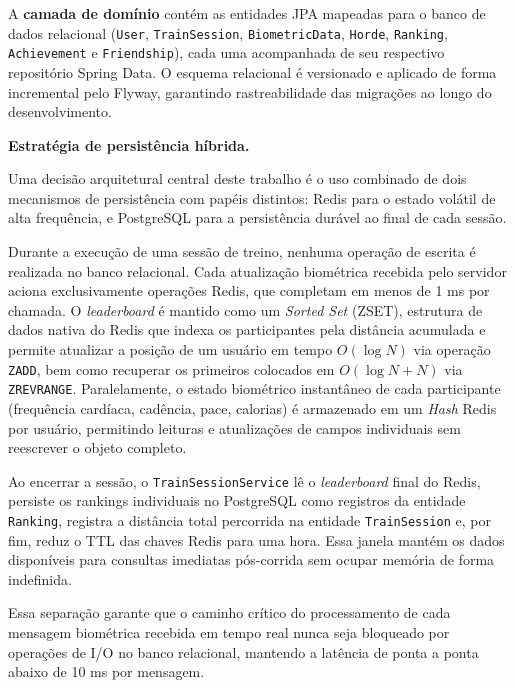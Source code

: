 A \textbf{camada de domínio} contém as entidades JPA mapeadas para o banco de dados relacional (\texttt{User}, \texttt{TrainSession}, \texttt{BiometricData}, \texttt{Horde}, \texttt{Ranking}, \texttt{Achievement} e \texttt{Friendship}), cada uma acompanhada de seu respectivo repositório Spring Data. O esquema relacional é versionado e aplicado de forma incremental pelo Flyway, garantindo rastreabilidade das migrações ao longo do desenvolvimento.

\vspace{0.2cm}
\noindent\textbf{Estratégia de persistência híbrida.}
\vspace{0.2cm}

Uma decisão arquitetural central deste trabalho é o uso combinado de dois mecanismos de persistência com papéis distintos: Redis para o estado volátil de alta frequência, e PostgreSQL para a persistência durável ao final de cada sessão.

Durante a execução de uma sessão de treino, nenhuma operação de escrita é realizada no banco relacional. Cada atualização biométrica recebida pelo servidor aciona exclusivamente operações Redis, que completam em menos de 1 ms por chamada. O \textit{leaderboard} é mantido como um \textit{Sorted Set} (ZSET), estrutura de dados nativa do Redis que indexa os participantes pela distância acumulada e permite atualizar a posição de um usuário em tempo $O(\log N)$ via operação \texttt{ZADD}, bem como recuperar os primeiros colocados em $O(\log N + N)$ via \texttt{ZREVRANGE}. Paralelamente, o estado biométrico instantâneo de cada participante (frequência cardíaca, cadência, pace, calorias) é armazenado em um \textit{Hash} Redis por usuário, permitindo leituras e atualizações de campos individuais sem reescrever o objeto completo.

Ao encerrar a sessão, o \texttt{TrainSessionService} lê o \textit{leaderboard} final do Redis, persiste os rankings individuais no PostgreSQL como registros da entidade \texttt{Ranking}, registra a distância total percorrida na entidade \texttt{TrainSession} e, por fim, reduz o TTL das chaves Redis para uma hora. Essa janela mantém os dados disponíveis para consultas imediatas pós-corrida sem ocupar memória de forma indefinida.

Essa separação garante que o caminho crítico do processamento de cada mensagem biométrica recebida em tempo real nunca seja bloqueado por operações de I/O no banco relacional, mantendo a latência de ponta a ponta abaixo de 10 ms por mensagem.

